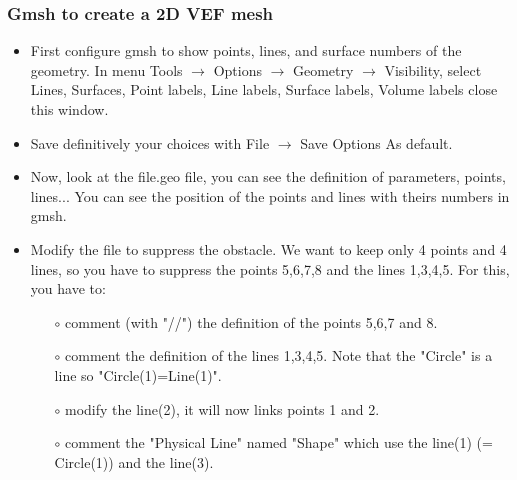 \documentclass[10pt, hyperref={unicode=true,pdfusetitle, bookmarks=true,bookmarksnumbered=false,bookmarksopen=false, breaklinks=false,pdfborder={0 0 1},backref=true,colorlinks=true,linkcolor=darkblue,pageanchor}]{beamer}
\begin{document}
\begin{frame}
\frametitle{Gmsh to create a 2D VEF mesh}
\begin{block}{}

\begin{itemize}
\item First configure gmsh to show points, lines, and surface numbers of the geometry. In menu Tools $\rightarrow$ Options $\rightarrow$ Geometry $\rightarrow$ Visibility, select Lines, Surfaces, Point labels, Line labels, Surface labels, Volume labels close this window. 
\item Save definitively your choices with File $\rightarrow$ Save Options As default.

\item Now, look at the file.geo file, you can see the definition of parameters, points, lines... You can see the position of the points and lines with theirs numbers in gmsh.

\item Modify the file to suppress the obstacle. We want to keep only 4 points and 4 lines, so you have to suppress the points 5,6,7,8 and the lines 1,3,4,5. For this, you have to:
    \begin{itemize}
    \item [$\circ$] comment (with "//") the definition of the points 5,6,7 and 8.
    \item [$\circ$] comment the definition of the lines 1,3,4,5. Note that the "Circle" is a line so "Circle(1)=Line(1)".
    \item [$\circ$] modify the line(2), it will now links points 1 and 2.
    \item [$\circ$] comment the "Physical Line" named "Shape" which use the line(1) (= Circle(1)) and the line(3).
    \end{itemize}
\end{itemize}

\end{block}
\end{frame}
\end{document}
